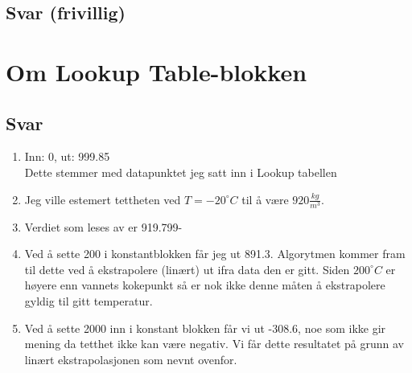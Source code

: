 \documentclass[answers,11pt]{exam}
\begin{document}
\begin{enumerate}[label=\alph*)]
  \begin{tcolorbox}
    \subsection*{Svar (frivillig)}

  \end{tcolorbox}

  \newpage
  \section*{Om {\sf  Lookup Table}-blokken}

  

  \newpage

  \begin{tcolorbox}
    \subsection*{Svar}

    \begin{enumerate}[label=i\arabic*)]

      \item
            Inn: 0, ut: 999.85 \\
            Dette stemmer med datapunktet jeg satt inn i Lookup tabellen
      \item
            Jeg ville estemert tettheten ved $T=-20^\circ C$ til å være $920 \frac{kg}{m^3}$.
      \item
            Verdiet som leses av er 919.799-
      \item
            Ved å sette 200 i konstantblokken får jeg ut 891.3. Algorytmen kommer fram til dette
            ved å ekstrapolere (linært) ut ifra data den er gitt. Siden $200^\circ C$ er høyere enn
            vannets kokepunkt så er nok ikke denne måten å ekstrapolere gyldig til gitt temperatur.
      \item
            Ved å sette 2000 inn i konstant blokken får vi ut -308.6, noe som ikke gir mening da
            tetthet ikke kan være negativ. Vi får dette resultatet på grunn av linært ekstrapolasjonen
            som nevnt ovenfor.
    \end{enumerate}

  \end{tcolorbox}


\end{enumerate}
\end{document}
